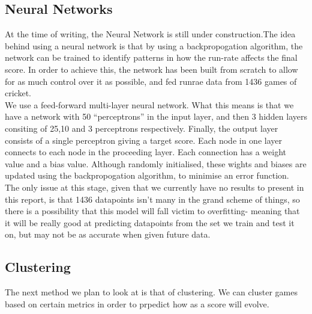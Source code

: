 \documentclass[11pt]{amsart}
\begin{document}
\subsection{Neural Networks}
At the time of writing, the Neural Network is still under construction.The idea behind using a neural network is that by using a backpropogation algorithm,
the network can be trained to identify patterns in how the run-rate affects the final score. In order to achieve this, the network has been built from scratch
to allow for as much control over it as possible, and fed runrae data from 1436 games of cricket. \\

We use a feed-forward multi-layer neural network. What this means is that we have a network with 50 ``perceptrons'' in the input layer,
and then 3 hidden layers consiting of 25,10 and 3 perceptrons respectively. Finally, the output layer consists of a single perceptron giving a target score.
Each node in one layer connects to each node in the proceeding layer. Each connection has a weight value and a bias value. Although randomly initialised,
these wights and biases are updated using the backpropogation algorithm, to minimise an error function. \\

The only issue at this stage, given that we currently have no results to present in this report, is that 1436 datapoints isn't many in the grand scheme of things,
so there is a possibility that this model will fall victim to overfitting- meaning that it will be really good at predicting datapoints from the set we train and test it on,
but may not be as accurate when given future data. 

\subsection{Clustering}
The next method we plan to look at is that of clustering. We can cluster games based on certain metrics in order to prpedict how as a score will evolve.


{}

\end{document}
